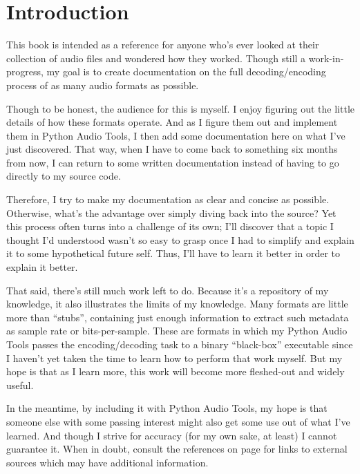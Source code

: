 \chapter{Introduction}
This book is intended as a reference for anyone who's ever looked
at their collection of audio files and wondered how they worked.
Though still a work-in-progress, my goal is to create documentation
on the full decoding/encoding process of as many audio formats as
possible.

Though to be honest, the audience for this is myself.
I enjoy figuring out the little details of how these formats operate.
And as I figure them out and implement them in Python Audio Tools,
I then add some documentation here on what I've just discovered.
That way, when I have to come back to something six months from now,
I can return to some written documentation instead of having to go
directly to my source code.

Therefore, I try to make my documentation as clear and concise
as possible.
Otherwise, what's the advantage over simply diving back into the source?
Yet this process often turns into a challenge of its own;
I'll discover that a topic I thought I'd understood wasn't so
easy to grasp once I had to simplify and explain it to some
hypothetical future self.
Thus, I'll have to learn it better in order to explain it better.

That said, there's still much work left to do.
Because it's a repository of my knowledge, it also illustrates
the limits of my knowledge.
Many formats are little more than ``stubs'', containing
just enough information to extract such metadata as
sample rate or bits-per-sample.
These are formats in which my Python Audio Tools passes the
encoding/decoding task to a binary ``black-box'' executable
since I haven't yet taken the time to learn how to perform that
work myself.
But my hope is that as I learn more, this work will become
more fleshed-out and widely useful.

In the meantime, by including it with Python Audio Tools,
my hope is that someone else with some passing interest might also
get some use out of what I've learned.
And though I strive for accuracy (for my own sake, at least)
I cannot guarantee it.
When in doubt, consult the references on page \pageref{references}
for links to external sources which may have additional information.
